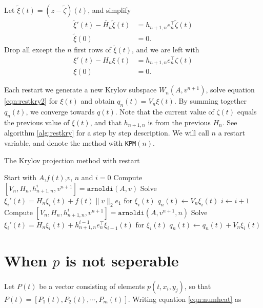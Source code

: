 Let $\tilde{\xi}(t) = (z-\tilde{\zeta})(t)$, and simplify
\begin{equation*} 
\begin{aligned}
 \tilde{\xi} '(t) -\tilde{H_n} \tilde{\xi}(t) &= h_{n+1,n}e_n^\top \tilde{\zeta} (t)  \\
\tilde{\xi}(0)& = 0.
\end{aligned}
\end{equation*}
Drop all except the $n$ first rows of $\tilde{\xi}(t)$, and we are left with
\begin{equation}\label{eqn:restkry2}
\begin{aligned}
 \xi '(t) -H_n \xi(t) &= h_{n+1,n}e_n^\top \zeta (t)  \\
\xi(0)& = 0.
\end{aligned}
\end{equation}

Each restart we generate a new Krylov subspace $W_n(A,v^{n+1})$, solve equation \eqref{eqn:restkry2} for $\xi(t)$ and obtain $ q_n(t) =  V_n\xi(t)$. By summing together $q_n(t)$, we converge towards $q(t)$\cite{elenaconv}. Note that the current value of $\zeta(t)$ equals the previous value of $\xi(t)$, and that $h_{n+1,n}$ is from the previous $H_n$. See algorithm \ref{alg:restkry} for a step by step description. We will call $n$ a restart variable, and denote the method with \texttt{KPM}$(n)$.
\begin{algorithm}
\begin{algorithmic} \caption{The Krylov projection method with restart} \label{alg:restkry} 
\STATE Start with $A$,$f(t)$,$v$, $n$ and $i = 0$
\STATE Compute $[V_n,H_n,h_{n+1,n}^i,v^{n+1}] = \texttt{arnoldi}(A,v)$
\STATE Solve $  \xi_i'(t) = H_n \xi_i(t) + f(t) \| v \|_2 e_1  $ for $\xi_i(t)$
\STATE $ q_n(t) \leftarrow  V_n \xi_i(t) $
    \STATE $i \leftarrow i + 1$
    \STATE Compute $[V_n,H_n,h_{n+1,n}^i,v^{n+1}] = \texttt{arnoldi}(A,v^{n+1},n)$
    \STATE Solve $ \xi_i'(t) = H_n \xi_i(t) + h_{n+1,n}^{i-1}e_n^\top \xi_{i-1}(t)  $ for $\xi_i(t)$
    \STATE $ q_n(t) \leftarrow q_n(t) + V_n \xi_i(t) $
\ENDWHILE
\end{algorithmic} 
\end{algorithm}

\section{When $p$ is not seperable} \label{sec:nonsep}
Let $P(t)$ be a vector consisting of elements $p(t, x_i, y_j)$, so that $P(t) = [P_1(t),P_2(t),\cdots, P_m(t)]$. Writing equation \eqref{eqn:numheat} as


